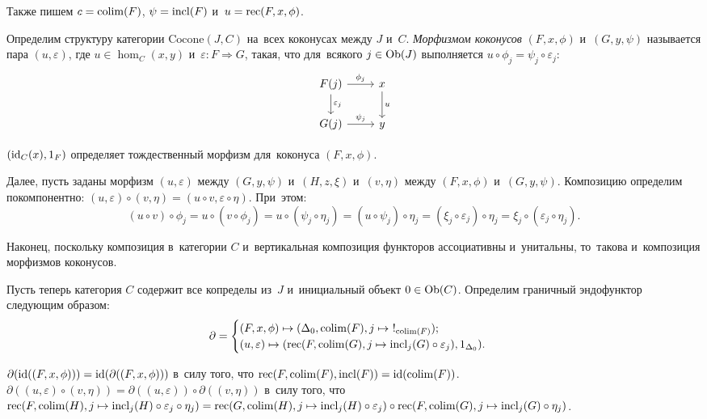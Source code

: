 \documentclass{article}
\begin{document}
Также пишем $c = \mathrm{colim}(F)$, $\psi = \mathrm{incl}(F)$ и~$u = \mathrm{rec}(F, x, \phi)$.

Определим структуру категории $\mathrm{Cocone}(J, C)$ на~всех коконусах между $J$ и~$C$.
\textit{Морфизмом коконусов} $(F, x, \phi)$ и~$(G, y, \psi)$ называется пара $(u, \varepsilon)$,
где $u \in \hom_C(x, y)$ и~$\varepsilon : F \Rightarrow G$, такая, что для~всякого $j \in \mathrm{Ob}(J)$
выполняется $u \circ \phi_j = \psi_j \circ \varepsilon_j$:
\[
    \begin{tikzcd}
        \arrow{d}{\varepsilon_j} F(j) \arrow{r}{\phi_j} & \arrow{d}{u} x \\
                                 G(j) \arrow{r}{\psi_j} &              y
    \end{tikzcd}
\]

$(\mathrm{id}_C(x), 1_F)$ определяет тождественный морфизм для~коконуса $(F, x, \phi)$.

Далее, пусть заданы морфизм $(u, \varepsilon)$ между $(G, y, \psi)$ и~$(H, z, \xi)$ и~$(v, \eta)$ между $(F, x, \phi)$ и~$(G, y, \psi)$.
Композицию определим покомпонентно: $(u, \varepsilon) \circ (v, \eta) = (u \circ v, \varepsilon \circ \eta)$.
При~этом:
$$
    (u \circ v) \circ \phi_j = u \circ (v \circ \phi_j)
                             = u \circ (\psi_j \circ \eta_j)
                             = (u \circ \psi_j) \circ \eta_j
                             = (\xi_j \circ \varepsilon_j) \circ \eta_j
                             = \xi_j \circ (\varepsilon_j \circ \eta_j).
$$

Наконец, поскольку композиция в~категории $C$ и~вертикальная композиция функторов ассоциативны
и~унитальны, то~такова и~композиция морфизмов коконусов.

Пусть теперь категория $C$ содержит все копределы из~$J$ и~инициальный объект $0 \in \mathrm{Ob}(C)$.
Определим граничный эндофунктор следующим образом:
$$
\partial = \begin{cases}
             (F, x, \phi) \mapsto (\Delta_0, \colim(F), j \mapsto\ !_{\colim(F)}); \\
             (u, \varepsilon) \mapsto (\rec(F, \colim(G), j \mapsto \incl_j(G) \circ \varepsilon_j), 1_{\Delta_0}).
           \end{cases}
$$

$\partial(\mathrm{id}((F, x, \phi))) = \mathrm{id}(\partial((F, x, \phi)))$ в~силу того, что $\mathrm{rec}(F, \mathrm{colim}(F), \mathrm{incl}(F)) = \mathrm{id}(\mathrm{colim}(F))$.
$\partial((u, \varepsilon) \circ (v, \eta)) = \partial((u, \varepsilon)) \circ \partial((v, \eta))$
в~силу того, что $\mathrm{rec}(F, \mathrm{colim}(H), j \mapsto \mathrm{incl}_j(H) \circ \varepsilon_j \circ \eta_j) =
                  \mathrm{rec}(G, \mathrm{colim}(H), j \mapsto \mathrm{incl}_j(H) \circ \varepsilon_j) \circ \mathrm{rec}(F, \mathrm{colim}(G), j \mapsto \mathrm{incl}_j(G) \circ \eta_j)$.
\end{document}
